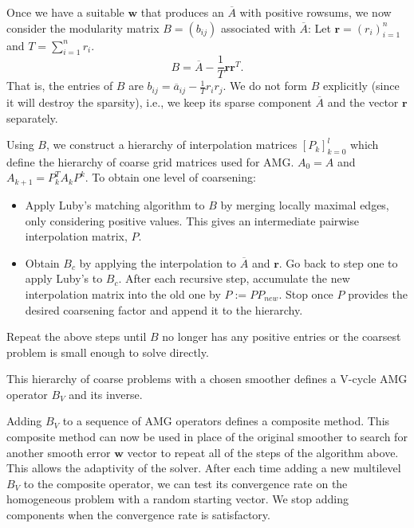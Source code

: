 \documentclass[a4paper,12pt]{amsart}
\numberwithin{equation}{section}
\def\bw{{\mathbf w}}
\def\br{{\mathbf r}}
\begin{document}
Once we have a suitable $\bw$ that produces an ${\overline A}$ with positive rowsums, 
we now consider the modularity matrix $B = (b_{ij})$ associated with ${\overline A}$:
Let $\br = (r_i)^n_{i=1}$ and $T = \sum\limits^n_{i=1} r_i$. 
\begin{equation*}
B = {\overline A} - \frac{1}{T} \br \br^T.
\end{equation*}
That is, the entries of $B$ are $b_{ij} = {\overline a}_{ij} -\frac{1}{T}r_ir_j$.
We do not form $B$ explicitly (since it will destroy the sparsity), i.e., we keep its sparse
component ${\overline A}$ and the vector $\br$ separately. 

Using $B$, we construct a hierarchy of interpolation matrices $[P_k]_{k=0}^l$ which define
the hierarchy of coarse grid matrices used for AMG. $A_0 = A$ and $A_{k+1} = P^T_k A_k P^k$.
To obtain one level of coarsening:
\begin{itemize}
   \item Apply Luby's matching algorithm to $B$ by merging locally maximal edges, only considering
      positive values. This gives an intermediate pairwise interpolation matrix, $P$.
   \item Obtain $B_c$ by applying the interpolation to ${\overline A}$ and $\br$. Go back to step
      one to apply Luby's to $B_c$. After each recursive step, accumulate the new interpolation
      matrix into the old one by $P := PP_{new}$. Stop once $P$ provides the desired coarsening
      factor and append it to the hierarchy.
\end{itemize}
Repeat the above steps until $B$ no longer has any positive entries or the coarsest problem is small
enough to solve directly.

This hierarchy of coarse problems with a chosen smoother defines a V-cycle AMG operator $B_V$ and
its inverse.

Adding $B_V$ to a sequence of AMG operators defines a composite method. This composite method can
now be used in place of the original smoother to search for another smooth error $\bw$ vector to
repeat all of the steps of the algorithm above. This allows the adaptivity of the solver. After
each time adding a new multilevel $B_V$ to the composite operator, we can test its convergence
rate on the homogeneous problem with a random starting vector. We stop adding components when
the convergence rate is satisfactory.
\end{document}
